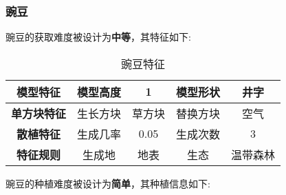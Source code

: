 \subsubsection{豌豆}

豌豆的获取难度被设计为\textbf{中等}，其特征如下:
\begin{table}[H]
    \centering
    \caption{豌豆特征}
    \label{table:豌豆特征}
    \setlength{\tabcolsep}{4mm}
    \begin{tabular}{c|cc|cc}
        \toprule
        \textbf{模型特征}   & 模型高度 & 1      & 模型形状 & 井字     \\
        \midrule
        \textbf{单方块特征} & 生长方块 & 草方块 & 替换方块 & 空气     \\
        \midrule
        \textbf{散植特征}   & 生成几率 & 0.05   & 生成次数 & 3        \\
        \midrule
        \textbf{特征规则}   & 生成地   & 地表   & 生态     & 温带森林 \\
        \bottomrule
    \end{tabular}
\end{table}


豌豆的种植难度被设计为\textbf{简单}，其种植信息如下:

